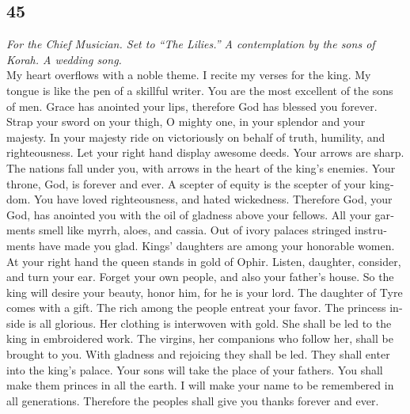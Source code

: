 \begin{paracol}{2}
\switchcolumn
\begin{otherlanguage}{english}

\hypertarget{section-89}{%
\section{45}\label{section-89}}

\emph{For the Chief Musician. Set to ``The Lilies.'' A contemplation by
the sons of Korah. A wedding song.}\\
 My heart overflows with a noble theme. I recite my verses
for the king. My tongue is like the pen of a skillful writer.
 You are the most excellent of the sons of men. Grace has
anointed your lips, therefore God has blessed you forever.
 Strap your sword on your thigh, O mighty one, in your
splendor and your majesty.  In your majesty ride on
victoriously on behalf of truth, humility, and righteousness. Let your
right hand display awesome deeds.  Your arrows are sharp.
The nations fall under you, with arrows in the heart of the king's
enemies.  Your throne, God, is forever and ever. A scepter
of equity is the scepter of your kingdom.  You have loved
righteousness, and hated wickedness. Therefore God, your God, has
anointed you with the oil of gladness above your fellows. 
All your garments smell like myrrh, aloes, and cassia. Out of ivory
palaces stringed instruments have made you glad.  Kings'
daughters are among your honorable women. At your right hand the queen
stands in gold of Ophir.  Listen, daughter, consider, and
turn your ear. Forget your own people, and also your father's house.
 So the king will desire your beauty, honor him, for he
is your lord.  The daughter of Tyre comes with a gift.
The rich among the people entreat your favor.  The
princess inside is all glorious. Her clothing is interwoven with gold.
 She shall be led to the king in embroidered work. The
virgins, her companions who follow her, shall be brought to you.
 With gladness and rejoicing they shall be led. They
shall enter into the king's palace.  Your sons will take
the place of your fathers. You shall make them princes in all the earth.
 I will make your name to be remembered in all
generations. Therefore the peoples shall give you thanks forever and
ever.

\end{otherlanguage}


\end{paracol}

